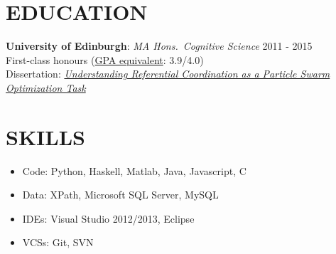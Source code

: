 \documentclass[line, margin]{res}
\newcommand{\CS}{C\nolinebreak\hspace{-.05em}\raisebox{.6ex}{\scriptsize\bf \#}}
\begin{document}
\address{131/6 Buccleuch Street, Edinburgh, Scotland EH8 9NE | +44 771 966 3016 | chase@chasestevens.com}

\begin{resume}
\section{EDUCATION}
\textbf{University of Edinburgh}: \textit{MA Hons.\ Cognitive Science} \hfill 2011 - 2015\\
First-class honours (\href{http://www.ed.ac.uk/schools-departments/humanities-soc-sci/visiting-exchange/academic-support/credits-grading}{GPA equivalent}: 3.9/4.0)\\
Dissertation: \textit{\href{http://www.chasestevens.com/papers/undergrad_dissertation.pdf}{Understanding Referential Coordination as a Particle Swarm Optimization Task}}

\section{SKILLS}
\begin{itemize}[leftmargin=10pt]
\item Code: Python, Haskell, Matlab, Java, Javascript, \CS
\item Data: XPath, Microsoft SQL Server, MySQL
\item IDEs: Visual Studio 2012/2013, Eclipse
\item VCSs: Git, SVN
\end{itemize}


\end{resume}
\end{document}

